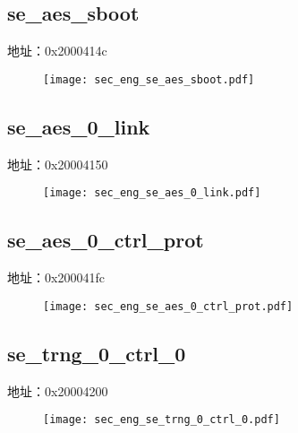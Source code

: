 \subsection{se\_aes\_sboot}
\label{sec_eng-se-aes-sboot}
地址：0x2000414c
 \begin{figure}[H]
\texttt{[image: sec\_eng\_se\_aes\_sboot.pdf]}
\end{figure}

\subsection{se\_aes\_0\_link}
\label{sec_eng-se-aes-0-link}
地址：0x20004150
 \begin{figure}[H]
\texttt{[image: sec\_eng\_se\_aes\_0\_link.pdf]}
\end{figure}

\subsection{se\_aes\_0\_ctrl\_prot}
\label{sec_eng-se-aes-0-ctrl-prot}
地址：0x200041fc
 \begin{figure}[H]
\texttt{[image: sec\_eng\_se\_aes\_0\_ctrl\_prot.pdf]}
\end{figure}

\subsection{se\_trng\_0\_ctrl\_0}
\label{sec_eng-se-trng-0-ctrl-0}
地址：0x20004200
 \begin{figure}[H]
\texttt{[image: sec\_eng\_se\_trng\_0\_ctrl\_0.pdf]}
\end{figure}

